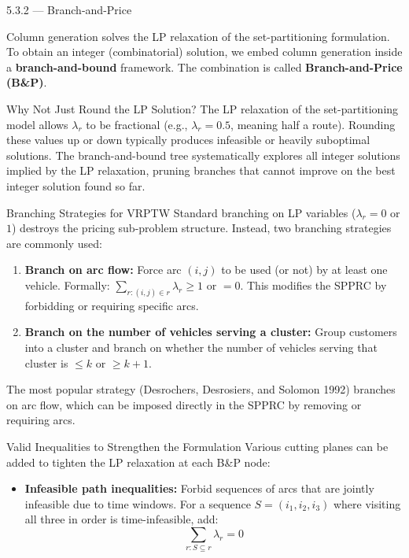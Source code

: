 \documentclass[aspectratio=169,10pt]{beamer}
\begin{document}
\begin{frame}[allowframebreaks]{5.3.2 --- Branch-and-Price}

Column generation solves the LP relaxation of the set-partitioning formulation.
To obtain an integer (combinatorial) solution, we embed column generation inside a
\textbf{branch-and-bound} framework.  The combination is called
\textbf{Branch-and-Price (B\&P)}.

\begin{block}{Why Not Just Round the LP Solution?}
The LP relaxation of the set-partitioning model allows $\lambda_r$ to be fractional
(e.g., $\lambda_r = 0.5$, meaning half a route).  Rounding these values up or down
typically produces infeasible or heavily suboptimal solutions.  The branch-and-bound
tree systematically explores all integer solutions implied by the LP relaxation,
pruning branches that cannot improve on the best integer solution found so far.
\end{block}

\begin{block}{Branching Strategies for VRPTW}
Standard branching on LP variables ($\lambda_r = 0$ or $1$) destroys the pricing
sub-problem structure.  Instead, two branching strategies are commonly used:

\begin{enumerate}
  \item \textbf{Branch on arc flow:} Force arc $(i,j)$ to be used (or not) by at
    least one vehicle.  Formally: $\sum_{r: (i,j) \in r} \lambda_r \geq 1$ or $= 0$.
    This modifies the SPPRC by forbidding or requiring specific arcs.

  \item \textbf{Branch on the number of vehicles serving a cluster:} Group customers
    into a cluster and branch on whether the number of vehicles serving that cluster
    is $\leq k$ or $\geq k+1$.
\end{enumerate}

The most popular strategy (Desrochers, Desrosiers, and Solomon 1992) branches on
arc flow, which can be imposed directly in the SPPRC by removing or requiring arcs.
\end{block}

\framebreak

\begin{block}{Valid Inequalities to Strengthen the Formulation}
Various cutting planes can be added to tighten the LP relaxation at each B\&P node:

\begin{itemize}
  \item \textbf{Infeasible path inequalities:} Forbid sequences of arcs that are
    jointly infeasible due to time windows.  For a sequence $S = (i_1, i_2, i_3)$
    where visiting all three in order is time-infeasible, add:
    \[
      \sum_{r: S \subseteq r} \lambda_r = 0
    \]


\end{itemize}
\end{block}
\end{frame}
\end{document}
